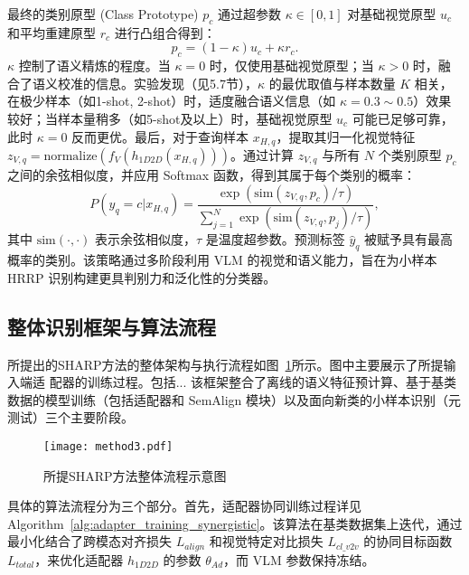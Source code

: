 最终的类别原型 (Class Prototype) $p_c$ 通过超参数 $\kappa \in [0, 1]$ 对基础视觉原型 $u_c$ 和平均重建原型 $r_c$ 进行凸组合得到：
\begin{equation} p_c = (1 - \kappa) u_c + \kappa r_c. \label{eq:semantic_fusion_prototype} \end{equation}
$\kappa$ 控制了语义精炼的程度。当 $\kappa=0$ 时，仅使用基础视觉原型；当 $\kappa>0$ 时，融合了语义校准的信息。实验发现（见5.7节），$\kappa$ 的最优取值与样本数量 $K$ 相关，在极少样本（如1-shot, 2-shot）时，适度融合语义信息（如 $\kappa=0.3 \sim 0.5$）效果较好；当样本量稍多（如5-shot及以上）时，基础视觉原型 $u_c$ 可能已足够可靠，此时 $\kappa=0$ 反而更优。最后，对于查询样本 $x_{H,q}$，提取其归一化视觉特征 $z_{V,q} = \text{normalize}(f_V(h_{1D2D}(x_{H,q})))$。通过计算 $z_{V,q}$ 与所有 $N$ 个类别原型 $p_c$ 之间的余弦相似度，并应用 Softmax 函数，得到其属于每个类别的概率：
\begin{equation} P(y_q = c | x_{H,q}) = \frac{\exp(\text{sim}(z_{V,q}, p_c) / \tau)}{\sum_{j=1}^{N} \exp(\text{sim}(z_{V,q}, p_j) / \tau)}, \label{eq:classification_semantic} \end{equation}
其中 $\text{sim}(\cdot, \cdot)$ 表示余弦相似度，$\tau$ 是温度超参数。预测标签 $\hat{y}_q$ 被赋予具有最高概率的类别。该策略通过多阶段利用 VLM 的视觉和语义能力，旨在为小样本 HRRP 识别构建更具判别力和泛化性的分类器。

\subsection{整体识别框架与算法流程} \label{subsec:overall_framework_semantic} 所提出的SHARP方法的整体架构与执行流程如图~\ref{fig:sharp_framework}所示。图中主要展示了所提输入端适
配器的训练过程。包括... 该框架整合了离线的语义特征预计算、基于基类数据的模型训练（包括适配器和 SemAlign 模块）以及面向新类的小样本识别（元测试）三个主要阶段。 

\begin{figure}[h!] \centering %
\texttt{[image: method3.pdf]} 
\caption{所提SHARP方法整体流程示意图} \label{fig:sharp_framework} %
\end{figure} 

具体的算法流程分为三个部分。首先，适配器协同训练过程详见 Algorithm~\ref{alg:adapter_training_synergistic}。该算法在基类数据集上迭代，通过最小化结合了跨模态对齐损失 $L_{align}$ 和视觉特定对比损失 $L_{cl\_v2v}$ 的协同目标函数 $L_{total}$，来优化适配器 $h_{1D2D}$ 的参数 $\theta_{Ad}$，而 VLM 参数保持冻结。

